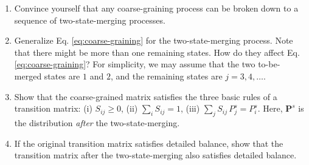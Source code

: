 \documentclass[12pt]{article}
\begin{document}
\begin{enumerate}
  \item
  Convince yourself that any coarse-graining process
  can be broken down to a sequence
  of two-state-merging processes.

  \item
  Generalize
  Eq. \eqref{eq:coarse-graining}
  for the two-state-merging process.
  Note that there might be more than one
  remaining states.
  How do they affect
  Eq. \eqref{eq:coarse-graining}?
  For simplicity, we may assume that
  the two to-be-merged states are $1$ and $2$,
  and the remaining states are $j = 3, 4, \dots$.

  \item
  Show that the coarse-grained matrix satisfies
  the three basic rules of a transition matrix:
  (i) $S_{ij} \ge 0$,
  (ii) $\sum_i S_{ij} = 1$,
  (iii) $\sum_j S_{ij} \, P^s_j = P^s_i$.
  Here, $\mathbf P^s$ is the distribution
  \emph{after} the two-state-merging.

  \item
  If the original transition matrix satisfies detailed balance,
  show that the transition matrix after the two-state-merging
  also satisfies detailed balance.
\end{enumerate}
\end{document}
